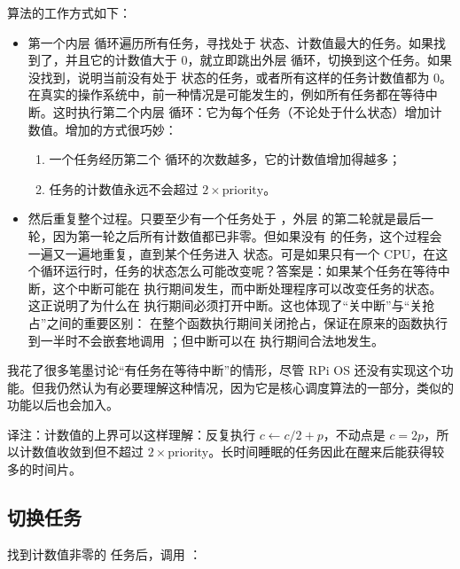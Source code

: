 算法的工作方式如下：

\begin{itemize}
  \item 第一个内层  循环遍历所有任务，寻找处于  状态、计数值最大的任务。如果找到了，并且它的计数值大于 0，就立即跳出外层  循环，切换到这个任务。如果没找到，说明当前没有处于  状态的任务，或者所有这样的任务计数值都为 0。在真实的操作系统中，前一种情况是可能发生的，例如所有任务都在等待中断。这时执行第二个内层  循环：它为每个任务（不论处于什么状态）增加计数值。增加的方式很巧妙：
  \begin{enumerate}
    \item 一个任务经历第二个  循环的次数越多，它的计数值增加得越多；
    \item 任务的计数值永远不会超过 $2 \times \text{priority}$。
  \end{enumerate}
  \item 然后重复整个过程。只要至少有一个任务处于 ，外层  的第二轮就是最后一轮，因为第一轮之后所有计数值都已非零。但如果没有  的任务，这个过程会一遍又一遍地重复，直到某个任务进入  状态。可是如果只有一个 CPU，在这个循环运行时，任务的状态怎么可能改变呢？答案是：如果某个任务在等待中断，这个中断可能在  执行期间发生，而中断处理程序可以改变任务的状态。这正说明了为什么在  执行期间必须打开中断。这也体现了“关中断”与“关抢占”之间的重要区别： 在整个函数执行期间关闭抢占，保证在原来的函数执行到一半时不会嵌套地调用 ；但中断可以在  执行期间合法地发生。
\end{itemize}

我花了很多笔墨讨论“有任务在等待中断”的情形，尽管 RPi OS 还没有实现这个功能。但我仍然认为有必要理解这种情况，因为它是核心调度算法的一部分，类似的功能以后也会加入。

\begin{remark}
  译注：计数值的上界可以这样理解：反复执行 $c \leftarrow c/2 + p$，不动点是 $c = 2p$，所以计数值收敛到但不超过 $2\times$priority。长时间睡眠的任务因此在醒来后能获得较多的时间片。
\end{remark}

\subsection{切换任务}

找到计数值非零的  任务后，调用 ：


